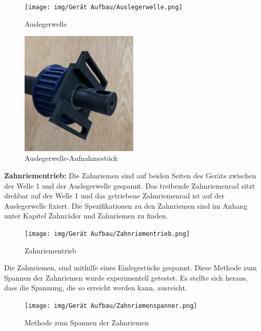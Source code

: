 \begin{figure}[H]
  \texttt{[image: img/Gerät Aufbau/Auslegerwelle.png]}
  \centering
  \caption{Auslegerwelle}
  \label{fig:Auslegerwelle}
\end{figure}

\begin{figure}[H]
  \includegraphics[width=0.5\textwidth]{img/Gerät Aufbau/Aufnahmestück.png}
  \centering
  \caption{Auslegerwelle-Aufnahmestück}
  \label{fig:Aufnahmestück}
\end{figure}

\newpage

\textbf{Zahnriementrieb:} Die Zahnriemen sind auf beiden Seiten des Geräts zwischen der Welle 1 und der Auslegerwelle gespannt. Das treibende Zahnriemenrad sitzt drehbar auf der Welle 1 und das getriebene Zahnriemenrad ist auf der Auslegerwelle fixiert. Die Spezifikationen zu den Zahnriemen sind im Anhang unter Kapitel Zahnräder und Zahnriemen zu finden.

\begin{figure}[H]
  \texttt{[image: img/Gerät Aufbau/Zahnriementrieb.png]}
  \centering
  \caption{Zahnriementrieb}
  \label{fig:Zahnriementrieb}
\end{figure}

Die Zahnriemen, sind mithilfe eines Einlegestücks gespannt. Diese Methode zum Spannen der Zahnriemen wurde experimentell getestet. Es stellte sich heraus, dass die Spannung, die so erreicht werden kann, ausreicht.

\begin{figure}[H]
  \texttt{[image: img/Gerät Aufbau/Zahnriemenspanner.png]}
  \centering
  \caption{Methode zum Spannen der Zahnriemen}
  \label{fig:Methode zum Spannen}
\end{figure}

\newpage




